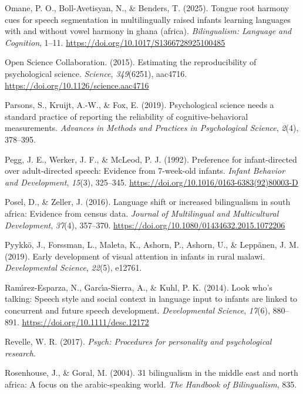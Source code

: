 \documentclass[
  english,
  ,man,floatsintext]{apa6}
\newlength{\cslhangindent}
\newenvironment{CSLReferences}[2] %
 {\begin{list}{}{%
  \setlength{\itemindent}{0pt}
  \setlength{\leftmargin}{0pt}
  \setlength{\parsep}{0pt}
  \ifodd #1
   \setlength{\leftmargin}{\cslhangindent}
   \setlength{\itemindent}{-1\cslhangindent}
  \fi
  \setlength{\itemsep}{#2\baselineskip}}}
 {\end{list}}
\begin{document}
\begin{CSLReferences}{1}{0}
Omane, P. O., Boll-Avetisyan, N., \& Benders, T. (2025). Tongue root harmony cues for speech segmentation in multilingually raised infants learning languages with and without vowel harmony in ghana (africa). \emph{Bilingualism: Language and Cognition}, 1--11. \url{https://doi.org/10.1017/S1366728925100485}

Open Science Collaboration. (2015). Estimating the reproducibility of psychological science. \emph{Science}, \emph{349}(6251), aac4716. \url{https://doi.org/10.1126/science.aac4716}

Parsons, S., Kruijt, A.-W., \& Fox, E. (2019). Psychological science needs a standard practice of reporting the reliability of cognitive-behavioral measurements. \emph{Advances in Methods and Practices in Psychological Science}, \emph{2}(4), 378--395.

Pegg, J. E., Werker, J. F., \& McLeod, P. J. (1992). Preference for infant-directed over adult-directed speech: Evidence from 7-week-old infants. \emph{Infant Behavior and Development}, \emph{15}(3), 325--345. \url{https://doi.org/10.1016/0163-6383(92)80003-D}

Posel, D., \& Zeller, J. (2016). Language shift or increased bilingualism in south africa: Evidence from census data. \emph{Journal of Multilingual and Multicultural Development}, \emph{37}(4), 357--370. \url{https://doi.org/10.1080/01434632.2015.1072206}

Pyykkö, J., Forssman, L., Maleta, K., Ashorn, P., Ashorn, U., \& Leppänen, J. M. (2019). Early development of visual attention in infants in rural malawi. \emph{Developmental Science}, \emph{22}(5), e12761.

Ramı́rez-Esparza, N., Garcı́a-Sierra, A., \& Kuhl, P. K. (2014). Look who's talking: Speech style and social context in language input to infants are linked to concurrent and future speech development. \emph{Developmental Science}, \emph{17}(6), 880--891. \url{https://doi.org/10.1111/desc.12172}

Revelle, W. R. (2017). \emph{Psych: Procedures for personality and psychological research}.

Rosenhouse, J., \& Goral, M. (2004). 31 bilingualism in the middle east and north africa: A focus on the arabic-speaking world. \emph{The Handbook of Bilingualism}, 835.


\end{CSLReferences}
\end{document}

